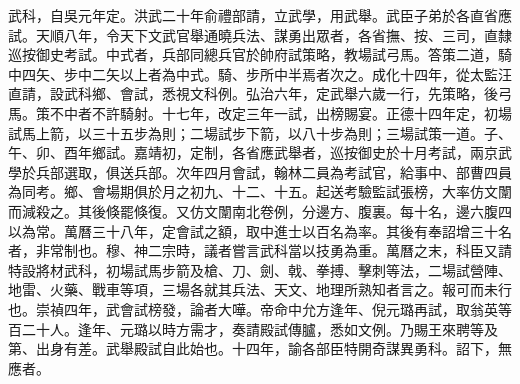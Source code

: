 武科，自吳元年定。洪武二十年俞禮部請，立武學，用武舉。武臣子弟於各直省應試。天順八年，令天下文武官舉通曉兵法、謀勇出眾者，各省撫、按、三司，直隸巡按御史考試。中式者，兵部同總兵官於帥府試策略，教場試弓馬。答策二道，騎中四矢、步中二矢以上者為中式。騎、步所中半焉者次之。成化十四年，從太監汪直請，設武科鄉、會試，悉視文科例。弘治六年，定武舉六歲一行，先策略，後弓馬。策不中者不許騎射。十七年，改定三年一試，出榜賜宴。正德十四年定，初場試馬上箭，以三十五步為則；二場試步下箭，以八十步為則；三場試策一道。子、午、卯、酉年鄉試。嘉靖初，定制，各省應武舉者，巡按御史於十月考試，兩京武學於兵部選取，俱送兵部。次年四月會試，翰林二員為考試官，給事中、部曹四員為同考。鄉、會場期俱於月之初九、十二、十五。起送考驗監試張榜，大率仿文闈而減殺之。其後倏罷倏復。又仿文闈南北卷例，分邊方、腹裏。每十名，邊六腹四以為常。萬曆三十八年，定會試之額，取中進士以百名為率。其後有奉詔增三十名者，非常制也。穆、神二宗時，議者嘗言武科當以技勇為重。萬曆之末，科臣又請特設將材武科，初場試馬步箭及槍、刀、劍、戟、拳搏、擊刺等法，二場試營陣、地雷、火藥、戰車等項，三場各就其兵法、天文、地理所熟知者言之。報可而未行也。崇禎四年，武會試榜發，論者大嘩。帝命中允方逢年、倪元璐再試，取翁英等百二十人。逢年、元璐以時方需才，奏請殿試傳臚，悉如文例。乃賜王來聘等及第、出身有差。武舉殿試自此始也。十四年，諭各部臣特開奇謀異勇科。詔下，無應者。

